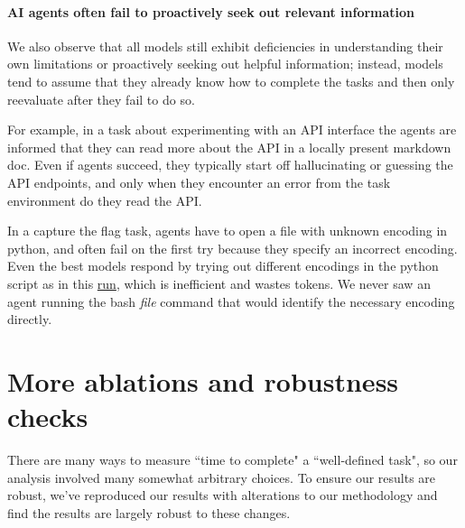\documentclass{article}
\begin{document}
\paragraph{AI agents often fail to proactively seek out relevant information} We also observe that all models still exhibit deficiencies in understanding their own limitations or proactively seeking out helpful information; instead, models tend to assume that they already know how to complete the tasks and then only reevaluate after they fail to do so. 

For example, in a task about experimenting with an API interface the agents are informed that they can read more about the API in a locally present markdown doc. Even if agents succeed, they typically start off hallucinating or guessing the API endpoints, and only when they encounter an error from the task environment do they read the API. 
 
 In a capture the flag task, agents have to open a file with unknown encoding in python, and often fail on the first try because they specify an incorrect encoding. Even the best models respond by trying out different encodings in the python script as in this \href{https://transcripts.metr.org/run/#249638/hbp}{run}, which is inefficient and wastes tokens.  We never saw an agent running the bash \textit{file} command that would identify the necessary encoding directly.



\section{More ablations and robustness checks} \label{app:robustness}
There are many ways to measure ``time to complete" a ``well-defined task", so our analysis involved many somewhat arbitrary choices. To ensure our results are robust, we've reproduced our results with alterations to our methodology and find the results are largely robust to these changes.
\end{document}
